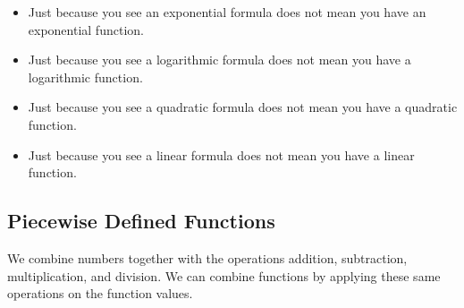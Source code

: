 \documentclass{ximera}
\begin{document}
\begin{warning}


\begin{itemize}
\item Just because you see an exponential formula does not mean you have an exponential function. \\ 
\item Just because you see a logarithmic formula does not mean you have a logarithmic function. \\ 
\item Just because you see a quadratic formula does not mean you have a quadratic function. \\ 
\item Just because you see a linear formula does not mean you have a linear function. \\ 
\end{itemize}

\end{warning}







































\subsection*{Piecewise Defined Functions}













We combine numbers together with the operations addition, subtraction, multiplication, and division.  We can combine functions by applying these same operations on the function values.  \\
\end{document}
